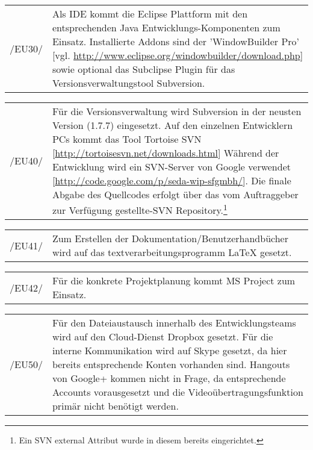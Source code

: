 \begin{tabular}{p{1.5cm}p{14.5cm}}

	 /EU30/	&  Als IDE kommt die Eclipse Plattform mit den entsprechenden Java Entwicklungs-Komponenten zum Einsatz. Installierte Addons sind der 'WindowBuilder Pro' [vgl. \url{http://www.eclipse.org/windowbuilder/download.php}] sowie optional das Subclipse Plugin für das Versionsverwaltungstool Subversion.\\[0.25cm]

\end{tabular}

\begin{tabular}{p{1.5cm}p{14.5cm}}

	 /EU40/	&  Für die Versionsverwaltung wird Subversion in der neusten Version (1.7.7) eingesetzt. Auf den einzelnen Entwicklern PCs kommt das Tool Tortoise SVN [\url{http://tortoisesvn.net/downloads.html}]
Während der Entwicklung wird ein SVN-Server von Google verwendet [\url{http://code.google.com/p/seda-wip-sfgmbh/}]. Die finale Abgabe des Quellcodes erfolgt über das vom Auftraggeber zur Verfügung gestellte-SVN Repository.\footnote{Ein SVN external Attribut wurde in diesem bereits eingerichtet.}\\[0.25cm]

\end{tabular}

\begin{tabular}{p{1.5cm}p{14.5cm}}

	 /EU41/	&  Zum Erstellen der Dokumentation/Benutzerhandbücher wird auf das textverarbeitungsprogramm LaTeX gesetzt.\\[0.25cm]

\end{tabular}

\begin{tabular}{p{1.5cm}p{14.5cm}}

	 /EU42/	&  Für die konkrete Projektplanung kommt MS Project zum Einsatz.\\[0.25cm]

\end{tabular}

\begin{tabular}{p{1.5cm}p{14.5cm}}

	 /EU50/	&  Für den Dateiaustausch innerhalb des Entwicklungsteams wird auf den Cloud-Dienst Dropbox gesetzt.
Für die interne Kommunikation wird auf Skype gesetzt, da hier bereits entsprechende Konten vorhanden sind. Hangouts von Google+ kommen nicht in Frage, da entsprechende Accounts vorausgesetzt und die Videoübertragungsfunktion primär nicht benötigt werden.\\[0.25cm]

\end{tabular}



